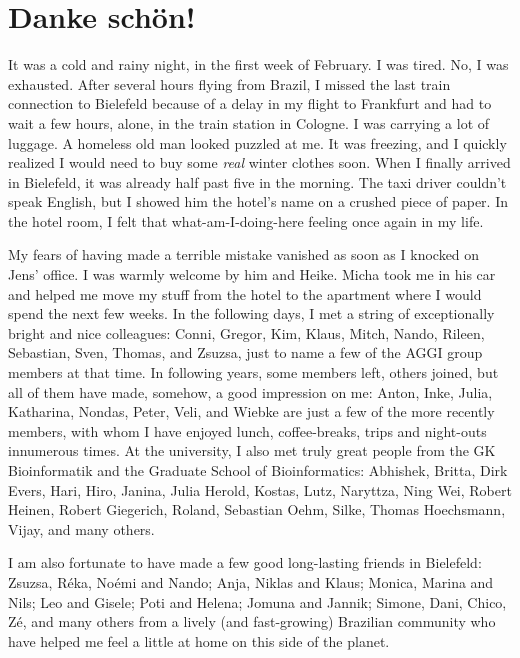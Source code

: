 \chapter*{Danke sch\"on!}

It was a cold and rainy night, in the first week of February. I was tired. No, I
was exhausted. After several hours flying from Brazil, I missed the last train
connection to Bielefeld because of a delay in my flight to Frankfurt and had to
wait a few hours, alone, in the train station in Cologne. I was carrying a lot
of luggage. A homeless old man looked puzzled at me. It was freezing, and I
quickly realized I would need to buy some \emph{real} winter clothes soon. When
I finally arrived in Bielefeld, it was already half past five in the morning.
The taxi driver couldn't speak English, but I showed him the hotel's name on a
crushed piece of paper. In the hotel room, I felt that what-am-I-doing-here
feeling once again in my life.

My fears of having made a terrible mistake vanished as soon as I knocked on
Jens' office. I was warmly welcome by him and Heike. Micha took me in his car
and helped me move my stuff from the hotel to the apartment where I would spend
the next few weeks. In the following days, I met a string of exceptionally
bright and nice colleagues: Conni, Gregor, Kim, Klaus, Mitch, Nando, Rileen,
Sebastian, Sven, Thomas, and Zsuzsa, just to name a few of the
AGGI group members at that time. In following years, some members left, others
joined, but all of them have made, somehow, a good impression on me: Anton,
Inke, Julia, Katharina, Nondas, Peter, Veli, and Wiebke are just a few
of the more recently members, with whom I have enjoyed lunch, coffee-breaks,
trips and night-outs innumerous times. At the university, I also met truly great
people from the GK Bioinformatik and the Graduate School of Bioinformatics:
Abhishek, Britta, Dirk Evers, Hari, Hiro, Janina, Julia Herold, Kostas, Lutz,
Naryttza, Ning Wei, Robert Heinen, Robert Giegerich, Roland, Sebastian Oehm,
Silke, Thomas Hoechsmann, Vijay, and many others.

I am also fortunate to have made a few good long-lasting friends in Bielefeld:
Zsuzsa, R\'eka, No\'emi and Nando; Anja, Niklas and Klaus; Monica, Marina and Nils;
Leo and Gisele; Poti and Helena; Jomuna and Jannik; Simone, Dani, Chico, Z\'e, and
many others from a lively (and fast-growing) Brazilian community who have helped
me feel a little at home on this side of the planet.

